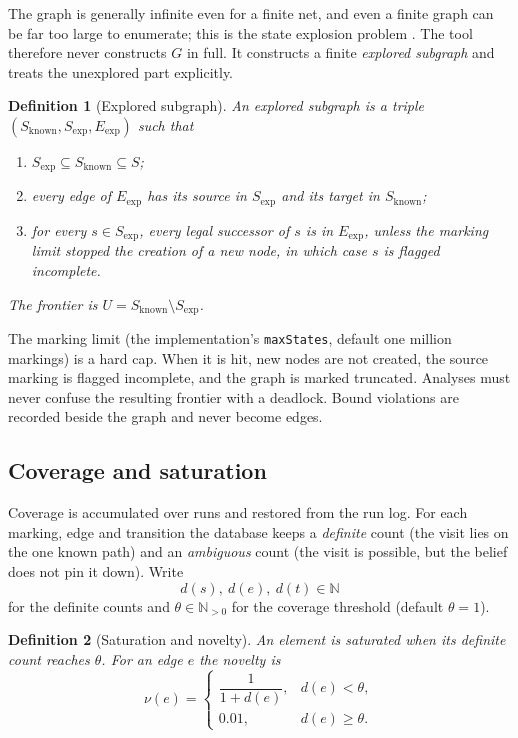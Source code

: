 \documentclass[11pt,a4paper]{article}
\newtheorem{definition}{Definition}[section]
\newcommand{\N}{\mathbb{N}}
\newcommand{\Npos}{\mathbb{N}_{>0}}
\begin{document}
The graph is generally infinite even for a finite net, and even a finite
graph can be far too large to enumerate; this is the state explosion problem
\cite{valmari1998state}.  The tool therefore never constructs $G$ in full.
It constructs a finite \emph{explored subgraph} and treats the unexplored
part explicitly.

\begin{definition}[Explored subgraph]\label{def:explored}
An explored subgraph is a triple $(S_{\mathrm{known}},S_{\mathrm{exp}},E_{\mathrm{exp}})$
such that
\begin{enumerate}[label=(\roman*),leftmargin=2.2em]
  \item $S_{\mathrm{exp}}\subseteq S_{\mathrm{known}}\subseteq S$;
  \item every edge of $E_{\mathrm{exp}}$ has its source in $S_{\mathrm{exp}}$
        and its target in $S_{\mathrm{known}}$;
  \item for every $s\in S_{\mathrm{exp}}$, every legal successor of $s$ is in
        $E_{\mathrm{exp}}$, unless the marking limit stopped the creation of
        a new node, in which case $s$ is flagged \emph{incomplete}.
\end{enumerate}
The \emph{frontier} is $U=S_{\mathrm{known}}\setminus S_{\mathrm{exp}}$.
\end{definition}

The marking limit (the implementation's \texttt{maxStates}, default one
million markings) is a hard cap.  When it is hit, new nodes are not created,
the source marking is flagged incomplete, and the graph is marked truncated.
Analyses must never confuse the resulting frontier with a deadlock.  Bound
violations are recorded beside the graph and never become edges.

\subsection{Coverage and saturation}

Coverage is accumulated over runs and restored from the run log.  For each
marking, edge and transition the database keeps a \emph{definite} count (the
visit lies on the one known path) and an \emph{ambiguous} count (the visit is
possible, but the belief does not pin it down).  Write
\[
  d(s),\ d(e),\ d(t)\in\N
\]
for the definite counts and $\theta\in\Npos$ for the coverage threshold
(default $\theta=1$).

\begin{definition}[Saturation and novelty]\label{def:saturation}
An element is \emph{saturated} when its definite count reaches $\theta$.  For
an edge $e$ the \emph{novelty} is
\[
  \nu(e)=
  \begin{cases}
    \dfrac{1}{1+d(e)}, & d(e)<\theta,\\[2mm]
    0.01, & d(e)\ge\theta.
  \end{cases}
\]
\end{definition}
\end{document}
